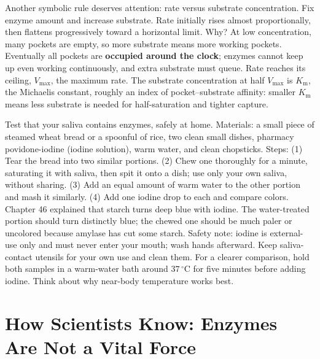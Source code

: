 Another symbolic rule deserves attention: rate versus substrate concentration. Fix enzyme amount and increase substrate. Rate initially rises almost proportionally, then flattens progressively toward a horizontal limit. Why? At low concentration, many pockets are empty, so more substrate means more working pockets. Eventually all pockets are \textbf{occupied around the clock}; enzymes cannot keep up even working continuously, and extra substrate must queue. Rate reaches its ceiling, $V_{\max}$, the maximum rate. The substrate concentration at half $V_{\max}$ is $K_{\mathrm{m}}$, the Michaelis constant, roughly an index of pocket--substrate affinity: smaller $K_{\mathrm{m}}$ means less substrate is needed for half-saturation and tighter capture.

\begin{shiyan}
Test that your saliva contains enzymes, safely at home. Materials: a small piece of steamed wheat bread or a spoonful of rice, two clean small dishes, pharmacy povidone-iodine (iodine solution), warm water, and clean chopsticks. Steps: (1) Tear the bread into two similar portions. (2) Chew one thoroughly for a minute, saturating it with saliva, then spit it onto a dish; use only your own saliva, without sharing. (3) Add an equal amount of warm water to the other portion and mash it similarly. (4) Add one iodine drop to each and compare colors. Chapter 46 explained that starch turns deep blue with iodine. The water-treated portion should turn distinctly blue; the chewed one should be much paler or uncolored because amylase has cut some starch. Safety note: iodine is external-use only and must never enter your mouth; wash hands afterward. Keep saliva-contact utensils for your own use and clean them. For a clearer comparison, hold both samples in a warm-water bath around $37\,^{\circ}\mathrm{C}$ for five minutes before adding iodine. Think about why near-body temperature works best.
\end{shiyan}

\section{How Scientists Know: Enzymes Are Not a Vital Force}

